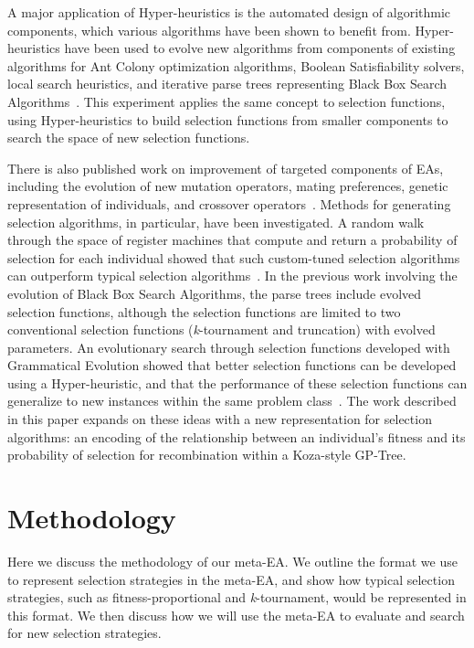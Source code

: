 \documentclass[sigconf]{acmart}
\begin{document}
A major application of Hyper-heuristics is the automated design of algorithmic components, which various algorithms have been shown to benefit from. Hyper-heuristics have been used to evolve new algorithms from components of existing algorithms for Ant Colony optimization algorithms, Boolean Satisfiability solvers, local search heuristics, and iterative parse trees representing Black Box Search Algorithms~\cite{lopez2012antcol, khudabukhsh2009satenstein, martin2013evolvingBBSA, burke2012localHeuristics}. This experiment applies the same concept to selection functions, using Hyper-heuristics to build selection functions from smaller components to search the space of new selection functions.

There is also published work on improvement of targeted components of EAs, including the evolution of new mutation operators, mating preferences, genetic representation of individuals, and crossover operators~\cite{woodward2012mutationGeneration, guntly2011limp, goldman2011scc, scott2015geneticRepresentations, hong2013probMutation}. Methods for generating selection algorithms, in particular, have been investigated. A random walk through the space of register machines that compute and return a probability of selection for each individual showed that such custom-tuned selection algorithms can outperform typical selection algorithms~\cite{woodward2011selection}. In the previous work involving the evolution of Black Box Search Algorithms, the parse trees include evolved selection functions, although the selection functions are limited to two conventional selection functions (\textit{k}-tournament and truncation) with evolved parameters. An evolutionary search through selection functions developed with Grammatical Evolution showed that better selection functions can be developed using a Hyper-heuristic, and that the performance of these selection functions can generalize to new instances within the same problem class~\cite{lourencco2013selection}. The work described in this paper expands on these ideas with a new representation for selection algorithms: an encoding of the relationship between an individual's fitness and its probability of selection for recombination within a Koza-style GP-Tree. 

\section{Methodology}
\label{Methodology}

Here we discuss the methodology of our meta-EA. We outline the format we use to represent selection strategies in the meta-EA, and show how typical selection strategies, such as fitness-proportional and \textit{k}-tournament, would be represented in this format. We then discuss how we will use the meta-EA to evaluate and search for new selection strategies.
\end{document}
